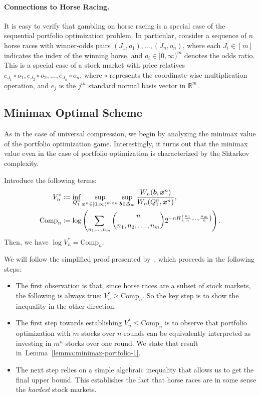 \documentclass[12pt]{article}
\begin{document}
\paragraph{Connections to Horse Racing.} It is easy to verify that gambling on horse racing is a special case of the sequential portfolio optimization problem. In particular, consider a sequence of $n$ horse races with winner-odds pairs $(J_1, o_1), \ldots, (J_n, o_n)$, where each $J_i \in [m]$  indicates the index of the winning horse, and $o_i \in [0, \infty)^m$ denotes the odds ratio.  This is a special case of a stock market with price relatives $e_{J_1} \circ o_1, e_{J_2} \circ o_2, \ldots, e_{J_n} \circ o_n$, where $\circ$ represents the coordinate-wise multiplication operation, and $e_{j}$ is the $j^{th}$ standard normal basis vector in $\mathbb{R}^m$. 

\subsection{Minimax Optimal Scheme}
As in the case of universal compression, we begin by analyzing the minimax value of the portfolio optimization game. Interestingly, it turns out that the minimax value even in the case of portfolio optimization is characterized by the Shtarkov complexity. 

\begin{theorem}
    \label{theorem:seq-portfolio-minimax} Introduce the following terms: 
    \begin{align}
        V_n^* &\coloneqq \inf_{Q_1^n} \sup_{{\boldsymbol x}^n \in [0,\infty)^{m \times n}}\sup_{\boldsymbol{b} \in \Delta_m}  \frac{W_n(\boldsymbol{b}, {\boldsymbol x}^n)}{W_n(Q_1^n, {\boldsymbol x}^n)},  \\
        \mathrm{Comp}_n &\coloneqq \log\left(  \sum_{n_1, \ldots, n_m} {n \choose n_1, n_2, \ldots, n_m} 2^{-n H\left( \frac{n_1}{n}, \ldots, \frac {n_m}{n} \right)} \right). 
    \end{align}
    Then, we have $\log V_n^* = \mathrm{Comp}_n$. 
\end{theorem}

We will follow the simplified proof presented by~\citet[Chapter 17]{cover2006elements}, which proceeds in the following steps: 
\begin{itemize}
    \item The first observation is that, since horse races are a subset of  stock markets, the following is always true: $V_n^* \geq \mathrm{Comp}_n$. So the key step is to show the inequality in the other direction. 

    \item The first step towards establishing $V_n^* \leq \mathrm{Comp}_n$ is to observe that portfolio optimization with $m$ stocks over $n$ rounds can be equivalently interpreted as investing in $m^n$ stocks over one round. We state that result in~Lemma~\ref{lemma:minimax-portfolio-1}. 

    \item The next step relies on a simple algebraic inequality that allows us to get the final upper bound. This establishes the fact that horse races are in some sense the \emph{hardest} stock markets. 
\end{itemize}
\end{document}
